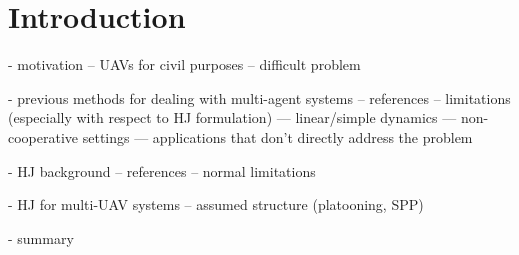 \section{Introduction}
- motivation
-- UAVs for civil purposes
-- difficult problem

- previous methods for dealing with multi-agent systems
-- references
-- limitations (especially with respect to HJ formulation)
--- linear/simple dynamics
--- non-cooperative settings
--- applications that don't directly address the problem

- HJ background
-- references
-- normal limitations

- HJ for multi-UAV systems
-- assumed structure (platooning, SPP)


- summary